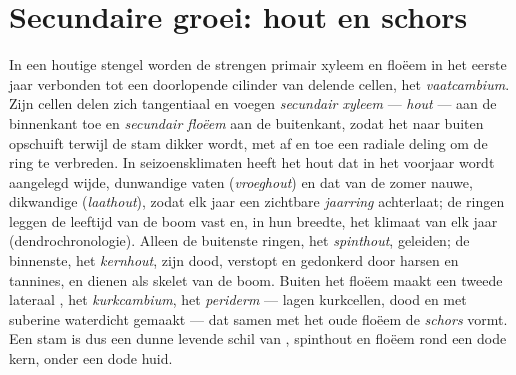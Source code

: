 \section{Secundaire groei: hout en schors}

\begin{definition}\label{def:b2:plant-meristems:wood}
In een houtige stengel worden de strengen primair xyleem en floëem in het
eerste jaar verbonden tot een doorlopende cilinder van delende cellen, het
\emph{vaatcambium}. Zijn cellen delen zich tangentiaal en voegen
\emph{secundair xyleem} --- \emph{hout} --- aan de binnenkant toe en
\emph{secundair floëem} aan de buitenkant, zodat het  naar buiten
opschuift terwijl de stam dikker wordt, met af en toe een radiale deling om
de ring te verbreden. In seizoensklimaten heeft het hout dat in het voorjaar
wordt aangelegd wijde, dunwandige vaten (\emph{vroeghout}) en dat van de
zomer nauwe, dikwandige (\emph{laathout}), zodat elk jaar een zichtbare
\emph{jaarring} achterlaat; de ringen leggen de leeftijd van de boom vast
en, in hun breedte, het klimaat van elk jaar (dendrochronologie). Alleen de
buitenste ringen, het \emph{spinthout}, geleiden; de binnenste, het
\emph{kernhout}, zijn dood, verstopt en gedonkerd door harsen en tannines,
en dienen als skelet van de boom. Buiten het floëem maakt een tweede
lateraal , het \emph{kurkcambium}, het \emph{periderm} --- lagen
kurkcellen, dood en met suberine waterdicht gemaakt --- dat samen met het
oude floëem de \emph{schors} vormt. Een stam is dus een dunne levende schil
van , spinthout en floëem rond een dode kern, onder een dode huid.
\end{definition}

